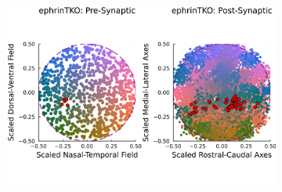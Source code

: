\begin{figure}
	\begin{subfigure}{\textwidth}
		\centering
		\includegraphics[width=\textwidth]{images/distributed_kernels/figure_distributed_kernels_ephrinTKO}
		\caption{}
	\end{subfigure}
~
	\begin{subfigure}{0.33\textwidth}
	\centering

\end{subfigure}
\end{figure}
